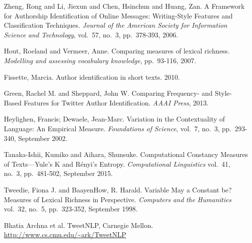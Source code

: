 \documentclass[journal, a4paper]{IEEEtran}
\begin{document}
\begin{thebibliography}{2}

	Zheng, Rong and Li, Jiexun and Chen, Hsinchun and Huang, Zan. A Framework for Authorship Identification
	of Online Messages: Writing-Style Features and Classification Techniques. {\em Journal of the American
	Society for Information Science and Technology},
	vol.~57, no.~3, pp.~378-393, 2006.

	Hout, Roeland and Vermeer, Anne. Comparing measures of lexical richness. {\em Modelling and assessing vocabulary 
	knowledge}, pp.~93-116, 2007.

	Fissette, Marcia. Author identification in short texts. 2010.

	Green, Rachel M. and Sheppard, John W. Comparing Frequency- and Style-Based Features for Twitter
	Author Identification. {\em AAAI Press}, 2013.
	
	Heylighen, Francis; Dewaele, Jean-Marc. Variation in the Contextuality of Language: An Empirical Measure.
	{\em Foundations of Science}, vol.~7, no.~3, pp.~293-340, September 2002.

	Tanaka-Ishii, Kumiko and Aihara, Shunsuke. Computational Constancy Measures of Texts—Yule's K and Rényi's Entropy.
	{\em Computational Linguistics} vol.~41, no.~3, pp.~481-502, September 2015.

	Tweedie, Fiona J. and BaayenHow, R. Harald. Variable May a Constant be? Measures of Lexical Richness in Perspective.
	{\em Computers and the Humanities} vol.~32, no.~5, pp.~323-352, September 1998.	

	Bhatia Archna et al. TweetNLP, Carnegie Mellon. \url{http://www.cs.cmu.edu/~ark/TweetNLP}

\end{thebibliography}
\end{document}
